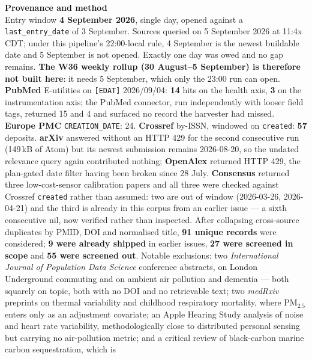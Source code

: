 \documentclass[10pt]{article}
\begin{document}


\vspace{4mm}
\begin{keybox}
{\sffamily\bfseries\footnotesize\color{Deep}Provenance and method}\\[1.2mm]
{\fontsize{7.2}{8.8}\selectfont
Entry window \textbf{4 September 2026}, single day, opened against a
\texttt{last\_entry\_date} of 3 September. Sources queried on 5 September 2026 at 11:4x
CDT; under this pipeline's 22:00-local rule, 4 September is the newest buildable date and
5 September is not opened. Exactly one day was owed and no gap remains. \textbf{The W36
weekly rollup (30 August--5 September) is therefore not built here}: it needs 5 September,
which only the 23:00 run can open.
\textbf{PubMed} E-utilities on \texttt{[EDAT]} 2026/09/04: \textbf{14} hits on the health
axis, \textbf{3} on the instrumentation axis; the PubMed connector, run independently with
looser field tags, returned 15 and 4 and surfaced no record the harvester had missed.
\textbf{Europe PMC} \texttt{CREATION\_DATE}: 24.
\textbf{Crossref} by-ISSN, windowed on \texttt{created}: \textbf{57} deposits.
\textbf{arXiv} answered without an HTTP 429 for the second consecutive run (149\,kB of
Atom) but its newest submission remains 2026-08-20, so the undated relevance query again
contributed nothing; \textbf{OpenAlex} returned HTTP 429, the plan-gated date filter having
been broken since 28 July. \textbf{Consensus} returned three low-cost-sensor calibration
papers and all three were checked against Crossref \texttt{created} rather than assumed:
two are out of window (2026-03-26, 2026-04-21) and the third is already in this corpus from
an earlier issue --- a sixth consecutive nil, now verified rather than inspected.
After collapsing cross-source duplicates by PMID, DOI and normalised title, \textbf{91
unique records} were considered; \textbf{9 were already shipped} in earlier issues,
\textbf{27 were screened in scope} and \textbf{55 were screened out}. Notable exclusions:
two \textit{International Journal of Population Data Science} conference abstracts, on
London Underground commuting and on ambient air pollution and dementia --- both squarely on
topic, both with no DOI and no retrievable text; two \textit{medRxiv} preprints on thermal
variability and childhood respiratory mortality, where PM$_{2.5}$ enters only as an
adjustment covariate; an Apple Hearing Study analysis of noise and heart rate variability,
methodologically close to distributed personal sensing but carrying no air-pollution
metric; and a critical review of black-carbon marine carbon sequestration, which is
}
\end{keybox}
\end{document}

